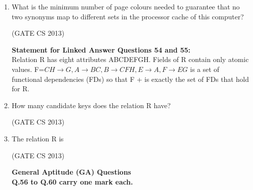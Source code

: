 \documentclass[a4paper, 11pt]{article}
\begin{document}
\begin{enumerate}
     \item What is the minimum number of page colours needed to guarantee that no two synonyms map to different sets in the processor cache of this computer? 
    \begin{enumerate}
     \end{enumerate}
     \hfill (GATE CS 2013)

     \textbf{Statement for Linked Answer Questions 54 and 55: }\\
     Relation R has eight attributes ABCDEFGH. Fields of R contain only atomic values. F=${CH\rightarrow G, A\rightarrow BC, B\rightarrow CFH, E\rightarrow A, F\rightarrow EG}$ is a set of functional dependencies (FDs) so that F + is exactly the set of FDs that hold for R. 
     \item How many candidate keys does the relation R have?
     \begin{enumerate}
     \end{enumerate}
     \hfill (GATE CS 2013)

     \item The relation R is 
     \begin{enumerate}
     \end{enumerate}
     \hfill (GATE CS 2013)

     \newpage

     \textbf{General Aptitude (GA) Questions}\\
     \textbf{Q.56 to Q.60 carry one mark each.}\\



\end{enumerate}
\end{document}
